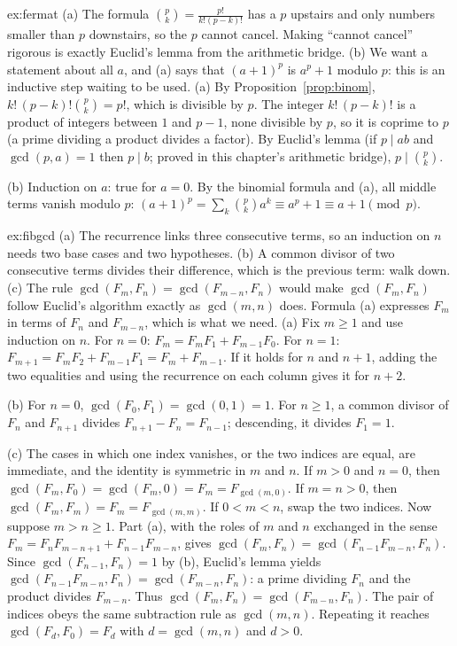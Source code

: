\begin{solution}{ex:fermat}
\idea (a) The formula $\binom pk=\frac{p!}{k!(p-k)!}$ has a $p$ upstairs and only numbers smaller than $p$ downstairs, so the $p$ cannot cancel. Making ``cannot cancel'' rigorous is exactly Euclid's lemma from the arithmetic bridge. (b) We want a statement about all $a$, and (a) says that $(a+1)^p$ is $a^p+1$ modulo $p$: this is an inductive step waiting to be used.
\writeup (a) By Proposition~\ref{prop:binom}, $k!\,(p-k)!\binom pk=p!$, which is divisible by $p$. The integer $k!\,(p-k)!$ is a product of integers between $1$ and $p-1$, none divisible by $p$, so it is coprime to $p$ (a prime dividing a product divides a factor). By Euclid's lemma (if $p\mid ab$ and $\gcd(p,a)=1$ then $p\mid b$; proved in this chapter's arithmetic bridge), $p\mid\binom pk$.

(b) Induction on $a$: true for $a=0$. By the binomial formula and (a), all middle terms vanish modulo $p$:
$(a+1)^p=\sum_k\binom pka^k\equiv a^p+1\equiv a+1\pmod p$.
\end{solution}

\begin{solution}{ex:fibgcd}
\idea (a) The recurrence links three consecutive terms, so an induction on $n$ needs two base cases and two hypotheses. (b) A common divisor of two consecutive terms divides their difference, which is the previous term: walk down. (c) The rule $\gcd(F_m,F_n)=\gcd(F_{m-n},F_n)$ would make $\gcd(F_m,F_n)$ follow Euclid's algorithm exactly as $\gcd(m,n)$ does. Formula (a) expresses $F_m$ in terms of $F_n$ and $F_{m-n}$, which is what we need.
\writeup (a) Fix $m\ge1$ and use induction on $n$. For $n=0$: $F_m=F_mF_1+F_{m-1}F_0$.
For $n=1$: $F_{m+1}=F_mF_2+F_{m-1}F_1=F_m+F_{m-1}$. If it holds for $n$ and $n+1$, adding the two
equalities and using the recurrence on each column gives it for $n+2$.

(b) For $n=0$, $\gcd(F_0,F_1)=\gcd(0,1)=1$. For $n\ge1$, a common divisor of $F_n$ and $F_{n+1}$ divides $F_{n+1}-F_n=F_{n-1}$; descending, it divides $F_1=1$.

(c) The cases in which one index vanishes, or the two indices are equal, are immediate, and the identity is symmetric in $m$ and $n$. If $m>0$ and $n=0$, then $\gcd(F_m,F_0)=\gcd(F_m,0)=F_m=F_{\gcd(m,0)}$. If $m=n>0$, then $\gcd(F_m,F_m)=F_m=F_{\gcd(m,m)}$. If $0<m<n$, swap the two indices. Now suppose $m>n\ge1$. Part (a), with the roles of $m$ and $n$ exchanged in the sense $F_m=F_nF_{m-n+1}+F_{n-1}F_{m-n}$, gives
$\gcd(F_m,F_n)=\gcd(F_{n-1}F_{m-n},F_n)$. Since $\gcd(F_{n-1},F_n)=1$ by (b), Euclid's lemma yields $\gcd(F_{n-1}F_{m-n},F_n)=\gcd(F_{m-n},F_n)$: a prime dividing $F_n$ and the product divides $F_{m-n}$. Thus $\gcd(F_m,F_n)=\gcd(F_{m-n},F_n)$. The pair of indices obeys the same subtraction rule as $\gcd(m,n)$. Repeating it reaches $\gcd(F_d,F_0)=F_d$ with $d=\gcd(m,n)$ and $d>0$.
\end{solution}


